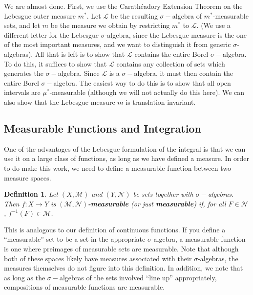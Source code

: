 \documentclass[12pt]{amsart}         %
\newtheorem{definition}{Definition}[section]
\theoremstyle{remark}
\begin{document}
We are almost done. First, we use the Carath\'{e}adory Extension Theorem on the Lebesgue outer measure $m^*$. Let $\mathcal{L}$ be the resulting $\sigma-$algebra of $m^*$-measurable sets, and let $m$ be the measure we obtain by restricting $m^*$ to $\mathcal{L}$. (We use a different letter for the Lebesgue $\sigma$-algebra, since the Lebesgue measure is the one of the most important measures, and we want to distinguish it from generic $\sigma$-algebras). All that is left is to show that $\mathcal{L}$ contains the entire Borel $\sigma-$algebra. To do this, it suffices to show that $\mathcal{L}$ contains any collection of sets which generates the $\sigma-$algebra. Since $\mathcal{L}$ is a $\sigma-$algebra, it must then contain the entire Borel $\sigma-$algebra. 
The easiest way to do this is to show that all open intervals are $\mu^*$-measurable (although we will not actually do this here). We can also show that the Lebesgue measure $m$ is translation-invariant.

\subsection{Measurable Functions and Integration}

One of the advantages of the Lebesgue formulation of the integral is that we can use it on a large class of functions, as long as we have defined a measure. In order to do make this work, we need to define a measurable function between two measure spaces.

\begin{definition}
Let $(X,\mathcal{M})$ and $(Y,\mathcal{N})$ be sets together with $\sigma-$algebras. Then $f: X \to Y$ is \textbf{$(\mathcal{M},\mathcal{N})$-measurable} (or just \textbf{measurable}) if, for all $F \in \mathcal{N}$, $f^{-1}(F) \in \mathcal{M}$. 
\end{definition}

This is analogous to our definition of continuous functions. If you define a ``measurable'' set to be a set in the appropriate $\sigma$-algebra, a measurable function is one where preimages of measurable sets are measurable. Note that although both of these spaces likely have measures associated with their $\sigma$-algebras, the measures themselves do not figure into this definition. In addition, we note that as long as the $\sigma-$algebras of the sets involved ``line up'' appropriately, compositions of measurable functions are measurable.
\end{document}
